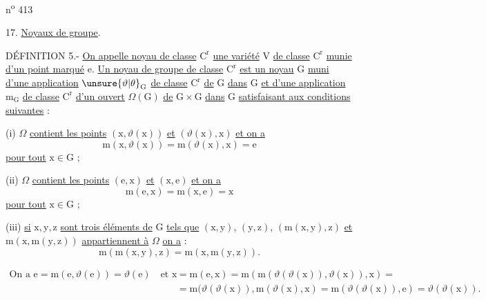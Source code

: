 \hfill n\textsuperscript{o} 413

17. \uline{Noyaux de groupe}.

DÉFINITION 5.- \uline{On appelle noyau de classe} $\mathrm C^{\mathrm r}$ \uline{une variété} $\mathrm V$ \uline{de classe} $\mathrm C^{\mathrm r}$ \uline{munie d'un point marqué} $\mathrm e$. \uline{Un noyau de groupe de classe} $\mathrm C^{\mathrm r}$ \uline{est un noyau} $\mathrm G$ \uline{muni d'une application} $\unsure{\vartheta|\theta}_{\mathrm G}$ \uline{de classe} $\mathrm C^{\mathrm r}$ \uline{de} $\mathrm G$ \uline{dans} $\mathrm G$ \uline{et d'une application} $\mathrm m_{\mathrm G}$ \uline{de classe} $\mathrm C^{\mathrm r}$ \uline{d'un ouvert} $\Omega(\mathrm G)$ \uline{de} $\mathrm G\times\mathrm G$ \uline{dans} $\mathrm G$ \uline{satisfaisant aux conditions suivantes} :

\begingroup
\makeatletter\tagsleft@true\makeatother
(i) $\Omega$ \uline{contient les points} $(\mathrm x,\vartheta(\mathrm x))$ \uline{et} $(\vartheta(\mathrm x),\mathrm x)$ \uline{et on a}
\[
\mathrm m(\mathrm x,\vartheta(\mathrm x))=\mathrm m(\vartheta(\mathrm x),\mathrm x)=\mathrm e \tag*{(36)}
\]
\uline{pour tout} $\mathrm x\in\mathrm G$ ;

(ii) $\Omega$ \uline{contient les points} $(\mathrm e,\mathrm x)$ \uline{et} $(\mathrm x,\mathrm e)$ \uline{et on a}
\[
\mathrm m(\mathrm e,\mathrm x)=\mathrm m(\mathrm x,\mathrm e)=\mathrm x \tag*{(37)}
\]
\uline{pour tout} $\mathrm x\in\mathrm G$ ;

(iii) \uline{si} $\mathrm x,\mathrm y,\mathrm z$ \uline{sont trois éléments de} $\mathrm G$ \uline{tels que} $(\mathrm x,\mathrm y)$, $(\mathrm y,\mathrm z)$, $(\mathrm m(\mathrm x,\mathrm y),\mathrm z)$ \uline{et} $\mathrm m(\mathrm x,\mathrm m(\mathrm y,\mathrm z))$ \uline{appartiennent à} $\Omega$\handwritten{$\unsure{\searrow|,}$} \uline{on a} :
\[
\mathrm m(\mathrm m(\mathrm x,\mathrm y),\mathrm z)=\mathrm m(\mathrm x,\mathrm m(\mathrm y,\mathrm z)). \tag*{(38)}
\]
\endgroup

\[
\begin{aligned}
\text{On a }\mathrm e=\mathrm m(\mathrm e,\vartheta(\mathrm e))=\vartheta(\mathrm e)
\quad\text{et }\mathrm x&=\mathrm m(\mathrm e,\mathrm x)=\mathrm m(\mathrm m(\vartheta(\vartheta(\mathrm x)),\vartheta(\mathrm x)),\mathrm x)=\\
&=\mathrm m(\vartheta(\vartheta(\mathrm x)),\mathrm m(\vartheta(\mathrm x),\mathrm x)=\mathrm m(\vartheta(\vartheta(\mathrm x)),\mathrm e)=\vartheta(\vartheta(\mathrm x)).
\end{aligned}
\]

